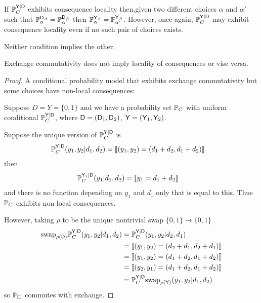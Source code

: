 If $\mathbb{P}_C^{\mathsf{Y}|\mathsf{D}}$ exhibits consequence locality then,given two different choices $\alpha$ and $\alpha'$ such that $\mathbb{P}_\alpha^{\mathsf{D}_A}=\mathbb{P}_{\alpha'}^{\mathsf{D}_A}$ then $\mathbb{P}_\alpha^{\mathsf{Y}_A}=\mathbb{P}_{\alpha'}^{\mathsf{Y}_A}$. However, once again, $\mathbb{P}_C^{\mathsf{Y}|\mathsf{D}}$ may exhibit consequence locality even if no such pair of choices exists.

Neither condition implies the other. 

\begin{theorem}
Exchange commutativity does not imply locality of consequences or vise versa.
\end{theorem}

\begin{proof}
A conditional probability model that exhibits exchange commutativity but some choices have non-local consequences:

Suppose $D=Y=\{0,1\}$ and we have a probability set $\mathbb{P}_C$ with uniform conditional $\mathbb{P}_C^{\mathsf{Y}|\mathsf{D}}$, where $\mathsf{D}=(\mathsf{D}_1,\mathsf{D}_2)$, $\mathsf{Y}=(\mathsf{Y}_1,\mathsf{Y}_2)$.

Suppose the unique version of $\mathbb{P}_C^{\mathsf{Y}|\mathsf{D}}$ is
\begin{align}
    \mathbb{P}_C^{\mathsf{Y}|\mathsf{D}}(y_1,y_2|d_1,d_2) &= \llbracket (y_1,y_2)= (d_1+d_2,d_1+d_2) \rrbracket
\end{align}
then 
\begin{align}
    \mathbb{P}_C^{\mathsf{Y}_1|\mathsf{D}}(y_1|d_1,d_2) &= \llbracket y_1 = d_1+d_2 \rrbracket
\end{align}
and there is no function depending on $y_1$ and $d_1$ only that is equal to this. Thus $\mathbb{P}_C$ exhibits non-local consequences. 

However, taking $\rho$ to be the unique nontrivial swap $\{0,1\}\to \{0,1\}$
\begin{align}
    \text{swap}_{\rho(\mathsf{D})}\mathbb{P}_{C}^{\mathsf{Y}|\mathsf{D}}(y_1,y_2|d_1,d_2) &= \mathbb{P}_{C}^{\mathsf{Y}|\mathsf{D}}(y_1,y_2|d_2,d_1)\\
    &= \llbracket (y_1,y_2)= (d_2+d_1,d_2+d_1) \rrbracket\\
    &= \llbracket (y_1,y_2)= (d_1+d_2,d_1+d_2) \rrbracket\\
    &= \llbracket (y_2,y_1)= (d_1+d_2,d_1+d_2) \rrbracket\\
    &= \mathbb{P}_{C}^{\mathsf{Y}|\mathsf{D}}\text{swap}_{\rho(\mathsf{Y})}(y_1,y_2|d_1,d_2)
\end{align}
so $\mathbb{P}_\square$ commutes with exchange.


\end{proof}
